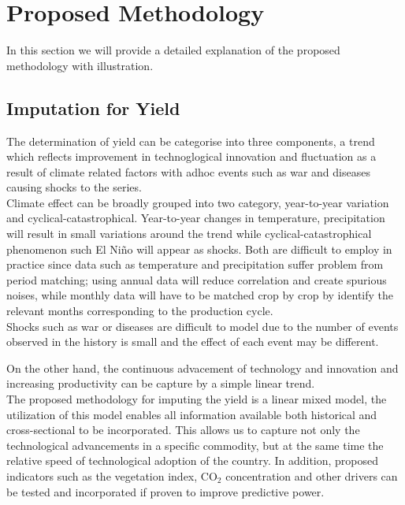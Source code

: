\documentclass[nojss]{jss}\usepackage[]{graphicx}\usepackage[]{color}
\begin{document}

\FloatBarrier
\section{Proposed Methodology}

In this section we will provide a detailed explanation of the proposed
methodology with illustration.



\subsection{Imputation for Yield}

The determination of yield can be categorise into three components, a
trend which reflects improvement in technoglogical innovation and
fluctuation as a result of climate related factors with adhoc events
such as war and diseases causing shocks to the series. \\


Climate effect can be broadly grouped into two category, year-to-year
variation and cyclical-catastrophical. Year-to-year changes in
temperature, precipitation will result in small variations around the
trend while cyclical-catastrophical phenomenon such El Ni\~{n}o will
appear as shocks. Both are difficult to employ in practice since data
such as temperature and precipitation suffer problem from period
matching; using annual data will reduce correlation and create
spurious noises, while monthly data will have to be matched crop by
crop by identify the relevant months corresponding to the production
cycle. \\

Shocks such as war or diseases are difficult to model due to
the number of events observed in the history is small and the effect
of each event may be different.

On the other hand, the continuous advacement of technology and
innovation and increasing productivity can be capture by a simple
linear trend.\\

The proposed methodology for imputing the yield is a linear mixed
model, the utilization of this model enables all information available
both historical and cross-sectional to be incorporated. This allows us
to capture not only the technological advancements in a specific
commodity, but at the same time the relative speed of technological
adoption of the country. In addition, proposed indicators such as the
vegetation index, $\text{CO}_2$ concentration and other drivers can be
tested and incorporated if proven to improve predictive power.\\
\end{document}
